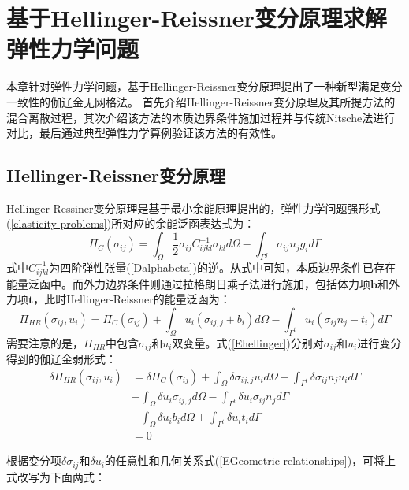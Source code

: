 \chapter{基于Hellinger-Reissner变分原理求解弹性力学问题}
本章针对弹性力学问题，基于Hellinger-Reissner变分原理提出了一种新型满足变分一致性的伽辽金无网格法。
首先介绍Hellinger-Reissner变分原理及其所提方法的混合离散过程，其次介绍该方法的本质边界条件施加过程并与传统Nitsche法进行对比，最后通过典型弹性力学算例验证该方法的有效性。
\section{Hellinger-Reissner变分原理}
Hellinger-Ressiner变分原理\cite{钱伟长1985广义变分原理}是基于最小余能原理提出的，弹性力学问题强形式(\ref{elasticity problems})所对应的余能泛函表达式为：
\begin{equation}
\Pi_C(\sigma_{ij}) = \int_\Omega \frac{1}{2}\sigma_{ij}C_{ijkl}^{-1}\sigma_{kl} d\Omega - \int_{\Gamma^g} \sigma_{ij} n_j g_i d\Gamma
\end{equation}
式中$C_{ijkl}^{-1}$为四阶弹性张量(\ref{Dalphabeta})的逆。从式中可知，本质边界条件已存在能量泛函中。而外力边界条件则通过拉格朗日乘子法进行施加，包括体力项$\pmb b$和外力项$\pmb t$，此时Hellinger-Reissner的能量泛函为：
\begin{equation}
\label{Ehellinger}
    \Pi_{H\!R}(\sigma_{ij},u_i)=\Pi_C(\sigma_{ij})
    +\int_{\Omega}u_i(\sigma_{ij,j}+b_i)d\Omega-\int_{\Gamma^t}u_i(\sigma_{ij} n_j-t_i)d\Gamma
\end{equation}
需要注意的是，$\Pi_{HR}$中包含$\sigma_{ij}$和$u_i$双变量。式(\ref{Ehellinger})分别对$\sigma_{ij}$和$u_i$进行变分得到的伽辽金弱形式：
\begin{equation}\label{weak form1}
\begin{split} 
    \delta\Pi_{H\!R}(\sigma_{ij},u_i)&=\delta\Pi_C(\sigma_{ij})+\int_{\Omega}\delta\sigma_{ij,j}u_id\Omega-\int_{\Gamma^t}\delta\sigma_{ij}n_ju_id\Gamma\\
    &+\int_{\Omega}\delta u_i\sigma_{ij,j}d\Omega-\int_{\Gamma^t}\delta u_i\sigma_{ij}n_jd\Gamma\\
    &+\int_{\Omega}\delta u_ib_id\Omega+\int_{\Gamma^t}\delta u_it_id\Gamma\\
    &=0
\end{split}
\end{equation}\par
根据变分项$\delta \sigma_{ij}$和$\delta u_i$的任意性和几何关系式(\ref{EGeometric relationships})，可将上式改写为下面两式：
